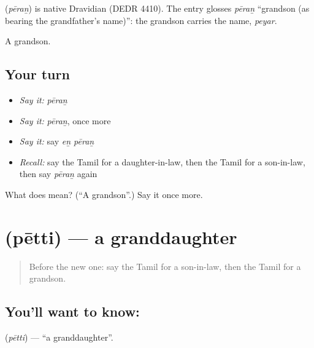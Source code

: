 \begin{cousinweb}
\textbf{} (\emph{pēraṉ}) is native Dravidian (DEDR 4410). The entry glosses \emph{pēraṉ} \textquotedblleft{}grandson (as bearing the grandfather's name)\textquotedblright{}: the grandson carries the name, \emph{peyar}.
\end{cousinweb}

\begin{grammarlens}[title={What you've built}]
A grandson.
\end{grammarlens}

\subsection*{Your turn}
\begin{itemize}
\raggedright
  \item \emph{Say it:} \emph{pēraṉ}
  \item \emph{Say it:} \emph{pēraṉ}, once more
  \item \emph{Say it:} say \emph{eṉ pēraṉ}
  \item \emph{Recall:} say the Tamil for a daughter-in-law, then the Tamil for a son-in-law, then say \emph{pēraṉ} again
\end{itemize}

\begin{tcolorbox}[breakable,colback=teal!4,colframe=teal!35!black,title={Before you move on}]
What does  mean? (\textquotedblleft{}A grandson\textquotedblright{}.) Say it once more.
\end{tcolorbox}
\section[\texorpdfstring{\ta{பேத்தி} (pētti)}{பேத்தி (pētti)}]{ (pētti) — a granddaughter}

\label{lesson:TA-C103-granddaughter}



\begin{quote}
Before the new one: say the Tamil for a son-in-law, then the Tamil for a grandson.
\end{quote}

\subsection*{You'll want to know: }
\textbf{} (\emph{pētti}) — \textquotedblleft{}a granddaughter\textquotedblright{}.

